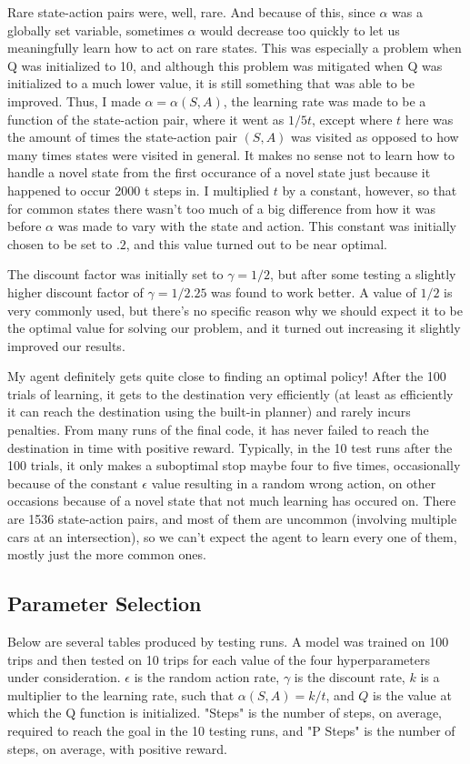 \documentclass{amsart}
\begin{document}
Rare state-action pairs were, well, rare.  And because of this, since $\alpha$ was a globally set variable, sometimes $\alpha$ would decrease too quickly to let us meaningfully learn how to act on rare states.  This was especially a problem when Q was initialized to 10, and although this problem was mitigated  when Q was initialized to a much lower value, it is still something that was able to be improved.  Thus, I made $\alpha = \alpha(S,A)$, the learning rate was made to be a function of the state-action pair, where it went as $1/5t$, except where $t$ here was the amount of times the state-action pair $(S,A)$ was visited as opposed to how many times states were visited in general.  It makes no sense not to learn how to handle a novel state from the first occurance of a novel state just because it happened to occur 2000 t steps in.  I multiplied $t$ by a constant, however, so that for common states there wasn't too much of a big difference from how it was before $\alpha$ was made to vary with the state and action.  This constant was initially chosen to be set to $.2$, and this value turned out to be near optimal.

The discount factor was initially set to $\gamma=1/2$, but after some testing a slightly higher discount factor of $\gamma=1/2.25$ was found to work better.  A value of $1/2$ is very commonly used, but there's no specific reason why we should expect it to be the optimal value for solving our problem, and it turned out increasing it slightly improved our results.

My agent definitely gets quite close to finding an optimal policy!  After the 100 trials of learning, it gets to the destination very efficiently (at least as efficiently it can reach the destination using the built-in planner) and rarely incurs penalties.  From many runs of the final code, it has never failed to reach the destination in time with positive reward.  Typically, in the 10 test runs after the 100 trials, it only makes a suboptimal stop maybe four to five times, occasionally because of the constant $\epsilon$ value resulting in a random wrong action, on other occasions because of a novel state that not much learning has occured on.  There are 1536 state-action pairs, and most of them are uncommon (involving multiple cars at an intersection), so we can't expect the agent to learn every one of them, mostly just the more common ones.

\subsection{Parameter Selection}
Below are several tables produced by testing runs.  A model was trained on 100 trips and then tested on 10 trips for each value of the four hyperparameters under consideration.  $\epsilon$ is the random action rate, $\gamma$ is the discount rate, $k$ is a multiplier to the learning rate, such that $\alpha(S,A) = k / t$, and $Q$ is the value at which the Q function is initialized.  "Steps" is the number of steps, on average, required to reach the goal in the 10 testing runs, and "P Steps" is the number of steps, on average, with positive reward.
\end{document}
